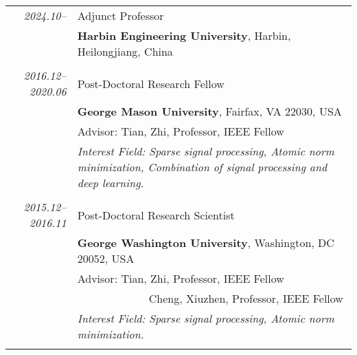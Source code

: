 \documentclass[paper=a4,fontsize=11pt]{scrartcl}
\begin{document}
\begin{longtable}{r|p{12cm}}
\emph{2024.10--} & Adjunct Professor \\	
& \normalsize\textbf{Harbin Engineering University}, Harbin, Heilongjiang, China \\
\multicolumn{2}{c}{} \\

\emph{2016.12--2020.06} & Post-Doctoral Research Fellow\\
& \normalsize\textbf{George Mason University}, Fairfax, VA 22030, USA\\
& Advisor: Tian, Zhi, Professor, IEEE Fellow \\
& \emph{Interest Field: Sparse signal processing, Atomic norm minimization, Combination of signal processing and deep learning.} \\
	\multicolumn{2}{c}{} \\


  \emph{2015.12--2016.11} & Post-Doctoral Research Scientist\\
  & \normalsize\textbf{George Washington University}, Washington, DC 20052, USA\\
  & Advisor: Tian, Zhi, Professor, IEEE Fellow \\
  & ~~~~~~~~~~~~~Cheng, Xiuzhen, Professor, IEEE Fellow \\
  & \emph{Interest Field: Sparse signal processing, Atomic norm minimization.}\\
  \multicolumn{2}{c}{}

%
	

\end{longtable}
\end{document}
